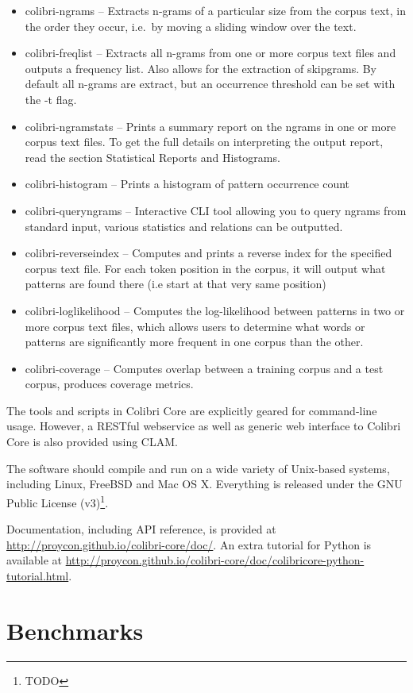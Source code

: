 \begin{itemize}
    \item colibri-ngrams -- Extracts n-grams of a particular size from the
        corpus text, in the order they occur, i.e.\ by moving a sliding window over the text.
    \item colibri-freqlist -- Extracts all n-grams from one or more corpus text files and outputs a frequency list. Also allows for the extraction of skipgrams. By default all n-grams are extract, but an occurrence threshold can be set with the -t flag.
    \item colibri-ngramstats -- Prints a summary report on the ngrams in one or more corpus text files. To get the full details on interpreting the output report, read the section Statistical Reports and Histograms.
    \item colibri-histogram -- Prints a histogram of pattern occurrence count
    \item colibri-queryngrams -- Interactive CLI tool allowing you to query ngrams from standard input, various statistics and relations can be outputted.
    \item colibri-reverseindex -- Computes and prints a reverse index for the specified corpus text file. For each token position in the corpus, it will output what patterns are found there (i.e start at that very same position)
    \item colibri-loglikelihood -- Computes the log-likelihood between patterns in two or more corpus text files, which allows users to determine what words or patterns are significantly more frequent in one corpus than the other.
    \item colibri-coverage -- Computes overlap between a training corpus and a test corpus, produces coverage metrics.
\end{itemize}

The tools and scripts in Colibri Core are explicitly geared for command-line
usage. However, a RESTful webservice as well as generic web interface to
Colibri Core is also provided using CLAM\cite{CLAM}.

The software should compile and run on a wide variety of Unix-based systems,
including Linux, FreeBSD and Mac OS X. Everything is released under the GNU
Public License (v3)\footnote{TODO}.

Documentation, including API reference, is provided at
\url{http://proycon.github.io/colibri-core/doc/}. An extra tutorial for Python
is available at
\url{http://proycon.github.io/colibri-core/doc/colibricore-python-tutorial.html}.

\section{Benchmarks}













